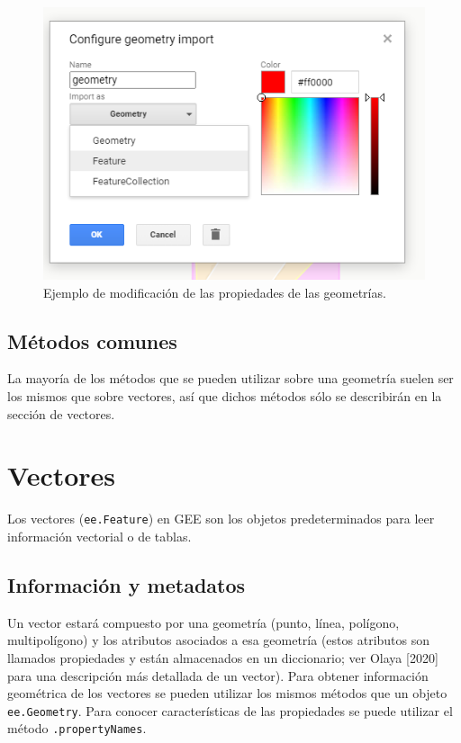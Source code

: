 \documentclass[
  12pt,
  letterpaper,
  twoside]{book}
\begin{document}
\begin{figure}[btp]

{\centering \includegraphics[width=0.8\linewidth]{Img/menuGeo} 

}

\caption{Ejemplo de modificación de las propiedades de las geometrías.}\label{fig:unnamed-chunk-62}
\end{figure}

\hypertarget{muxe9todos-comunes}{%
\section{Métodos comunes}\label{muxe9todos-comunes}}

La mayoría de los métodos que se pueden utilizar sobre una geometría suelen ser los mismos que sobre vectores, así que dichos métodos sólo se describirán en la sección de vectores.

\newpage

\hypertarget{vectores}{%
\chapter{Vectores}\label{vectores}}

Los vectores (\texttt{ee.Feature}) en GEE son los objetos predeterminados para leer información vectorial o de tablas.

\hypertarget{informaciuxf3n-y-metadatos-1}{%
\section{Información y metadatos}\label{informaciuxf3n-y-metadatos-1}}

Un vector estará compuesto por una geometría (punto, línea, polígono, multipolígono) y los atributos asociados a esa geometría (estos atributos son llamados propiedades y están almacenados en un diccionario; ver Olaya {[}2020{]} para una descripción más detallada de un vector). Para obtener información geométrica de los vectores se pueden utilizar los mismos métodos que un objeto \texttt{ee.Geometry}. Para conocer características de las propiedades se puede utilizar el método \texttt{.propertyNames}.
\end{document}
